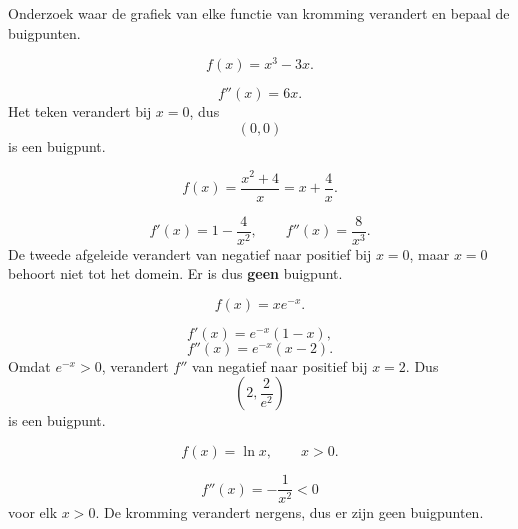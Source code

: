 \documentclass{ximera}
\begin{document}
\begin{oefening}{\oefB\ESS}
Onderzoek waar de grafiek van elke functie van kromming verandert en
bepaal de buigpunten.

\begin{question}
\[
f(x)=x^3-3x.
\]
\begin{oplossing}
\[
f''(x)=6x.
\]
Het teken verandert bij \(x=0\), dus
\[
\boxed{(0,0)}
\]
is een buigpunt.
\end{oplossing}
\end{question}

\begin{question}
\[
f(x)=\frac{x^2+4}{x}=x+\frac4x.
\]
\begin{oplossing}
\[
f'(x)=1-\frac4{x^2},
\qquad
f''(x)=\frac8{x^3}.
\]
De tweede afgeleide verandert van negatief naar positief bij \(x=0\),
maar \(x=0\) behoort niet tot het domein. Er is dus \textbf{geen}
buigpunt.
\end{oplossing}
\end{question}

\begin{question}
\[
f(x)=x e^{-x}.
\]
\begin{oplossing}
\[
f'(x)=e^{-x}(1-x),
\]
\[
f''(x)=e^{-x}(x-2).
\]
Omdat \(e^{-x}>0\), verandert \(f''\) van negatief naar positief bij
\(x=2\). Dus
\[
\boxed{\left(2,\frac2{e^2}\right)}
\]
is een buigpunt.
\end{oplossing}
\end{question}

\begin{question}
\[
f(x)=\ln x,\qquad x>0.
\]
\begin{oplossing}
\[
f''(x)=-\frac1{x^2}<0
\]
voor elk \(x>0\). De kromming verandert nergens, dus er zijn geen
buigpunten.
\end{oplossing}
\end{question}
\end{oefening}


\end{document}

